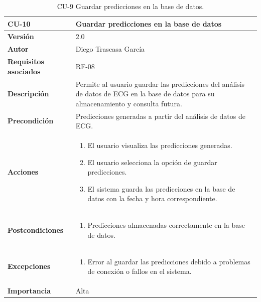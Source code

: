 \begin{table}[p]
	\centering
	\begin{tabularx}{\linewidth}{ p{} p{} }
		\toprule
		\textbf{CU-10}    & \textbf{Guardar predicciones en la base de datos}\\
		\toprule
		\textbf{Versión}              & 2.0    \\
		\textbf{Autor}                & Diego Trascasa García \\
		\textbf{Requisitos asociados} & RF-08 \\
		\textbf{Descripción}          & Permite al usuario guardar las predicciones del análisis de datos de ECG en la base de datos para su almacenamiento y consulta futura. \\
		\textbf{Precondición}         & Predicciones generadas a partir del análisis de datos de ECG. \\
		\textbf{Acciones}             &
		\begin{enumerate}
			\item El usuario visualiza las predicciones generadas.
			\item El usuario selecciona la opción de guardar predicciones.
			\item El sistema guarda las predicciones en la base de datos con la fecha y hora correspondiente.
		\end{enumerate}\\
		\textbf{Postcondiciones}      & 
		\begin{enumerate}
			\item Predicciones almacenadas correctamente en la base de datos.
		\end{enumerate}\\
		\textbf{Excepciones}          & 
		\begin{enumerate}
			\item Error al guardar las predicciones debido a problemas de conexión o fallos en el sistema.
		\end{enumerate}\\
		\textbf{Importancia}          & Alta \\
		\bottomrule
	\end{tabularx}
	\caption{CU-9 Guardar predicciones en la base de datos.}
    \label{CU-9}
\end{table}


